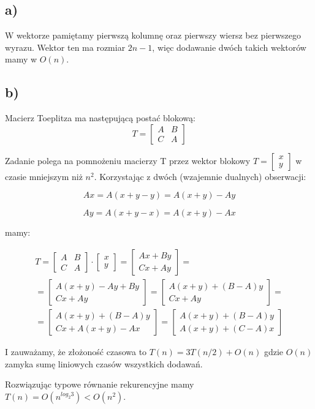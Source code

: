 \subsection{a)}
W wektorze pamiętamy pierwszą kolumnę oraz pierwszy wiersz bez pierwszego wyrazu. Wektor ten ma rozmiar $2n - 1$, więc dodawanie dwóch takich wektorów mamy w $O(n)$.
\subsection{b)}
Macierz Toeplitza ma następującą postać blokową:
$$ T = \left[ \begin{matrix}
					A & B \\
					C & A
				\end{matrix} \right]$$

Zadanie polega na pomnożeniu macierzy T przez wektor blokowy $ T = \left[ \begin{matrix}x \\ y\end{matrix} \right] $ w czasie mniejszym niż $n^2$. Korzystając z dwóch (wzajemnie dualnych) obserwacji:

$$Ax = A(x + y - y) = A(x+y) - Ay$$

$$Ay = A(x + y - x) = A(x+y) - Ax$$


mamy:


\begin{equation*}
\begin{split}
T = \left[ \begin{matrix}A & B\\ C & A\end{matrix} \right] \cdot \left[ \begin{matrix} x \\ y\end{matrix} \right] = \left[ \begin{matrix} Ax + By\\ Cx + Ay\end{matrix} \right] = \\
= \left[ \begin{matrix}A(x+y)-Ay + By\\ Cx + Ay\end{matrix} \right] = \left[ \begin{matrix}A(x+y)+(B - A)y\\ Cx + Ay\end{matrix} \right] = \\
= \left[ \begin{matrix}A(x+y)+(B - A)y\\ Cx + A(x+y) - Ax \end{matrix} \right] =  \left[ \begin{matrix}A(x+y)+(B - A)y\\ A(x+y) + (C-A)x\end{matrix} \right]
\end{split}
\end{equation*}

I zauważamy, że złożoność czasowa to $T(n) = 3 T(n/2) + O(n)$ gdzie $O(n)$ zamyka sumę liniowych czasów wszystkich dodawań.

Rozwiązując typowe równanie rekurencyjne mamy $T(n) = O(n^{log_2 3}) < O(n^2)$.


\section{} %
\section{} %

